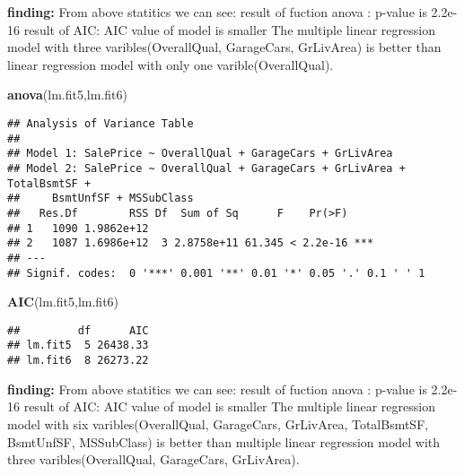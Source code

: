 \documentclass[]{article}
\newenvironment{Shaded}{\begin{snugshade}}{\end{snugshade}}
\newcommand{\KeywordTok}[1]{\textcolor[rgb]{0.13,0.29,0.53}{\textbf{#1}}}
\newcommand{\NormalTok}[1]{#1}
\begin{document}
\textbf{finding:} From above statitics we can see: result of fuction
anova : p-value is 2.2e-16 result of AIC: AIC value of model is smaller
The multiple linear regression model with three varibles(OverallQual,
GarageCars, GrLivArea) is better than linear regression model with only
one varible(OverallQual).

\begin{Shaded}
\begin{Highlighting}[]
\KeywordTok{anova}\NormalTok{(lm.fit5,lm.fit6)}
\end{Highlighting}
\end{Shaded}

\begin{verbatim}
## Analysis of Variance Table
## 
## Model 1: SalePrice ~ OverallQual + GarageCars + GrLivArea
## Model 2: SalePrice ~ OverallQual + GarageCars + GrLivArea + TotalBsmtSF + 
##     BsmtUnfSF + MSSubClass
##   Res.Df        RSS Df  Sum of Sq      F    Pr(>F)    
## 1   1090 1.9862e+12                                   
## 2   1087 1.6986e+12  3 2.8758e+11 61.345 < 2.2e-16 ***
## ---
## Signif. codes:  0 '***' 0.001 '**' 0.01 '*' 0.05 '.' 0.1 ' ' 1
\end{verbatim}

\begin{Shaded}
\begin{Highlighting}[]
\KeywordTok{AIC}\NormalTok{(lm.fit5,lm.fit6)}
\end{Highlighting}
\end{Shaded}

\begin{verbatim}
##         df      AIC
## lm.fit5  5 26438.33
## lm.fit6  8 26273.22
\end{verbatim}

\textbf{finding:} From above statitics we can see: result of fuction
anova : p-value is 2.2e-16 result of AIC: AIC value of model is smaller
The multiple linear regression model with six varibles(OverallQual,
GarageCars, GrLivArea, TotalBsmtSF, BsmtUnfSF, MSSubClass) is better
than multiple linear regression model with three varibles(OverallQual,
GarageCars, GrLivArea).
\end{document}
